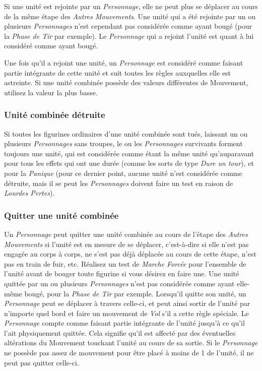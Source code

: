 Si une unité est rejointe par un \emph{Personnage}, elle ne peut plus se déplacer au cours de la même étape des \emph{Autres Mouvements}. Une unité qui a été rejointe par un ou plusieurs \emph{Personnages} n'est cependant pas considérée comme ayant bougé (pour la \emph{Phase de Tir} par exemple). Le \emph{Personnage} qui a rejoint l'unité est quant à lui considéré comme ayant bougé.

Une fois qu'il a rejoint une unité, un \emph{Personnage} est considéré comme faisant partie intégrante de cette unité et suit toutes les règles auxquelles elle est astreinte. Si une unité combinée possède des valeurs différentes de Mouvement, utilisez la valeur la plus basse.

\subsubsection*{Unité combinée détruite}

Si toutes les figurines ordinaires d'une unité combinée sont tués, laissant un ou plusieurs \emph{Personnages} sans troupes, le ou les \emph{Personnages} survivants forment toujours une unité, qui est considérée comme étant la même unité qu'auparavant pour tous les effets qui ont une durée (comme les sorts de type \emph{Dure un tour}), et pour la \emph{Panique} (pour ce dernier point, aucune unité n'est considérée comme détruite, mais il se peut les \emph{Personnages} doivent faire un test en raison de \emph{Lourdes Pertes}).

\subsubsection*{Quitter une unité combinée}

Un \emph{Personnage} peut quitter une unité combinée au cours de l'étape des \emph{Autres Mouvements} si l'unité est en mesure de se déplacer, c'est-à-dire si elle n'est pas engagée au corps à corps, ne s'est pas déjà déplacée au cours de cette étape, n'est pas en train de fuir, etc. Réalisez un test de \emph{Marche Forcée} pour l'ensemble de l'unité avant de bouger toute figurine si vous désirez en faire une. Une unité quittée par un ou plusieurs \emph{Personnages} n'est pas considérée comme ayant elle-même bougé, pour la \emph{Phase de Tir} par exemple. Lorsqu'il quitte son unité, un \emph{Personnage} peut se déplacer à travers celle-ci, et peut ainsi sortir de l'unité par n'importe quel bord et faire un mouvement de \emph{Vol} s'il a cette règle spéciale. Le \emph{Personnage} compte comme faisant partie intégrante de l'unité jusqu'à ce qu'il l'ait physiquement quittée. Cela  signifie qu'il est affecté par des éventuelles altérations du Mouvement touchant l'unité au cours de sa sortie. Si le \emph{Personnage} ne possède pas assez de mouvement pour être placé à moins de \unit{1}{\pouce} de l'unité, il ne peut pas quitter celle-ci.

